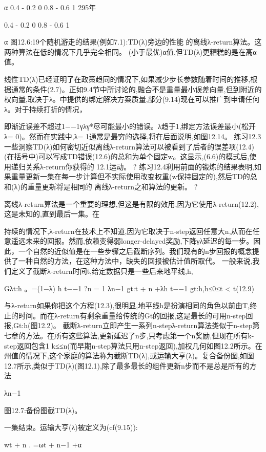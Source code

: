 α
0.4 - 0.2 0 					0.8 - 0.6 					1
295年
 
0.4 - 0.2 0 					0.8 - 0.6 					1

α
图12.6:19个随机游走的结果(例如7.1):TD(λ)旁边的性能
的离线λ-return算法。这两种算法在低的情况下几乎完全相同。
(小于最优)α值,但TD(λ)更糟糕的是在高α值。


线性TD(λ)已经证明了在政策趋同的情况下,如果减少步长参数随着时间的推移,根据通常的条件(2.7)。正如9.4节中所讨论的,融合不是重量最小误差向量,但到附近的权向量,取决于λ。中提供的绑定解决方案质量,部分(9.14)现在可以推广到申请任何λ。对于持续打折的情况，
 
即渐近误差不超过1−−1γλγ*尽可能最小的错误。λ趋于1,绑定方法误差最小(松开λ= 0)。然而在实践中,λ= 1通常是最穷的选择,将在后面说明,如图12.14。
练习12.3一些洞察TD(λ)如何密切近似离线λ-return算法可以被看到了后者的误差项(12.4)(在括号中)可以写成TD错误(12.6)的总和为单个固定w。这显示,(6.6)的模式后,使用递归关系λ-return你获得的
12.1运动。 					?
练习12.4利用前面的锻炼的结果表明,如果重量更新一集在每一步计算但不实际使用改变权重(w保持固定的),然后TD的总和(λ)的重量更新将是相同的
离线λ-return之和算法的更新。 					?

离线λ-return算法是一个重要的理想,但这是有限的效用,因为它使用λ-return(12.2),这是未知的,直到最后一集。在

持续的情况下,λ-return在技术上不知道,因为它取决于n-step返回任意大n,从而在任意遥远未来的回报。然而,依赖变得弱longer-delayed奖励,下降γλ延迟的每一步。因此，一个自然的近似值是在一些步骤之后截断序列。我们现有的n步回报的概念提供了一种自然的方法，在这种方法中，缺失的回报被估计值所取代。
一般来说,我们定义了截断λ-return时间t,给定数据只是一些后来地平线,h,


Gλt:h
。=(1−λ)
h t−−1 ?n = 1
λn−1 gt:t + n +λh t−−1 gt:h,h≤0≤t < t(12.9)


与λ-return如果你把这个方程(12.3),很明显,地平线h是扮演相同的角色以前由T,终止的时间。而在λ-return有剩余重量给传统的Gt的回报,这是最长的可用n-step回报,Gt:h(图12.2)。
截断λ-return立即产生一系列n-stepλ-return算法类似于n-step第七章的方法。在所有这些算法,更新延迟了n步,只考虑第一个n奖励,但现在所有k-step返回包含1 k≤≤n(而早期n-step算法只用n-step返回),加权几何如图12.2所示。在州值的情况下,这个家庭的算法称为截断TD(λ),或运输大亨(λ)。复合备份图,如图12.7所示,类似于TD(λ)(图12.1),除了最多最长的组件更新n步而不是总是所有的方法
 
λn−1

图12.7:备份图截TD(λ)。

一集结束。运输大亨(λ)被定义为(cf(9.15)):

wt + n
.
=ωt + n−1 +α

